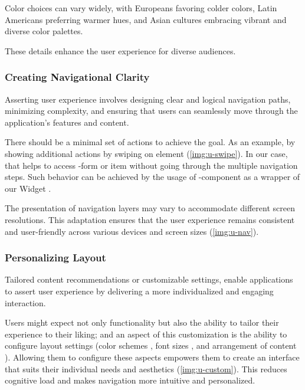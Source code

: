 Color choices can vary widely, with Europeans favoring colder colors, Latin Americans preferring warmer hues, and Asian 
cultures embracing vibrant and diverse color palettes.


\noindent These details \cite{Rein14} enhance the user experience for diverse audiences.


\subsubsection{Creating Navigational Clarity} 

Asserting user experience involves designing clear and logical navigation paths, minimizing complexity, and ensuring 
that users can seamlessly move through the application's features and content.

There should be a minimal set of actions to achieve the goal. As an example, by showing additional actions by swiping 
on element (\cref{img:u-swipe}). In our case, that helps to access -form or  item without going 
through the multiple navigation steps. Such behavior can be achieved by the usage of 
-component as a wrapper of our Widget .

The presentation of navigation layers may vary to accommodate different screen resolutions. This adaptation 
ensures that the user experience remains consistent and user-friendly across various devices and screen sizes 
(\cref{img:u-nav}).




\subsubsection{Personalizing Layout}

Tailored content recommendations or customizable settings, enable applications to assert user experience by delivering 
a more individualized and engaging interaction.

Users might expect not only functionality but also the ability to tailor their experience to their liking; and an 
aspect of this customization is the ability to configure layout settings (color schemes , font sizes 
, and arrangement of content ). Allowing them to configure these aspects empowers them to 
create an interface that suits their individual needs and aesthetics (\cref{img:u-custom}). This reduces cognitive 
load and makes navigation more intuitive and personalized.

